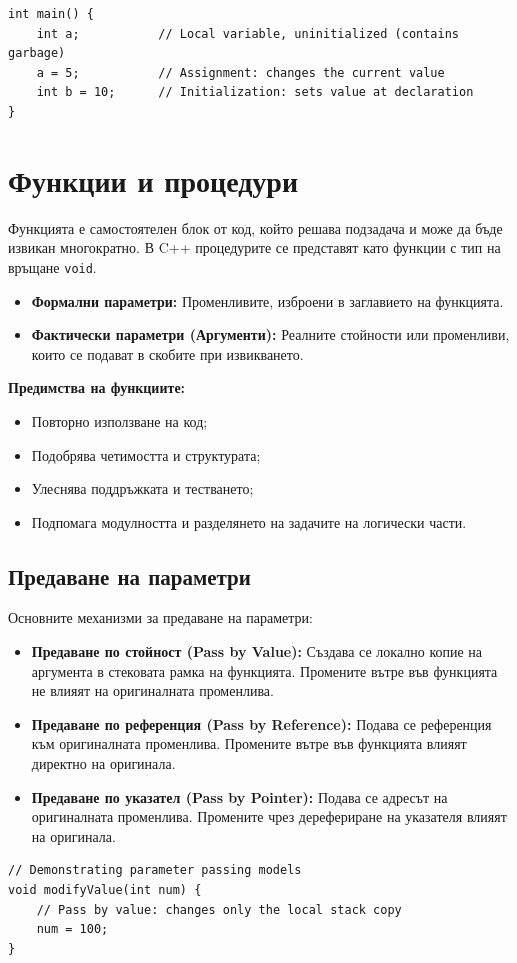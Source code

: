 \documentclass{scrartcl}
\begin{document}
\begin{FlushLeft}
\begin{lstlisting}
int main() {
    int a;           // Local variable, uninitialized (contains garbage)
    a = 5;           // Assignment: changes the current value
    int b = 10;      // Initialization: sets value at declaration
}
\end{lstlisting}

\section{Функции и процедури}
Функцията е самостоятелен блок от код, който решава подзадача и може да бъде извикан многократно. В C++ процедурите се представят като функции с тип на връщане \texttt{void}.
\begin{itemize}
    \item \textbf{Формални параметри:} Променливите, изброени в заглавието на функцията.
    \item \textbf{Фактически параметри (Аргументи):} Реалните стойности или променливи, които се подават в скобите при извикването.
\end{itemize}
\textbf{Предимства на функциите:}
\begin{itemize}
    \item Повторно използване на код;
    \item Подобрява четимостта и структурата;
    \item Улеснява поддръжката и тестването;
    \item Подпомага модулността и разделянето на задачите на логически части.
\end{itemize}

\subsection{Предаване на параметри}
Основните механизми за предаване на параметри:
\begin{itemize}
    \item \textbf{Предаване по стойност (Pass by Value):} Създава се локално копие на аргумента в стековата рамка на функцията. Промените вътре във функцията не влияят на оригиналната променлива.
    \item \textbf{Предаване по референция (Pass by Reference):} Подава се референция към оригиналната променлива. Промените вътре във функцията влияят директно на оригинала.
    \item \textbf{Предаване по указател (Pass by Pointer):} Подава се адресът на оригиналната променлива. Промените чрез дерефериране на указателя влияят на оригинала.
\end{itemize}
\begin{lstlisting}
// Demonstrating parameter passing models
void modifyValue(int num) {
    // Pass by value: changes only the local stack copy
    num = 100; 
}


\end{lstlisting}
\end{FlushLeft}
\end{document}
